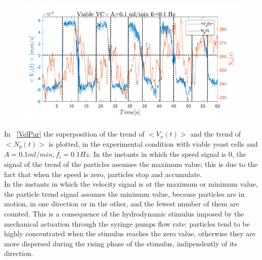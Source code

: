 \documentclass[journal]{IEEEtran}
\theoremstyle{definition}
\theoremstyle{remark}
\begin{document}
\begin{figure}[t]
	\centering
	\includegraphics[width=1\columnwidth]{images/VelPar}
\end{figure}

In ~\fig\ref{VelPar} the superposition of the trend of  $<V_x(t)>$ and the trend of $<N_p(t)>$ is plotted, in the experimental condition with viable yeast cells and {$A=0.1 ml/min, f_i= 0.1 Hz$}. In the instants in which the speed signal is 0, the signal of the trend of the particles assumes the maximum value; this is due to the fact that when the speed is zero, particles stop and accumulate.
\\In the instants in which the velocity signal is at the maximum or minimum value, the particle trend signal assumes the minimum value, because particles are in motion, in one direction or in the other, and the fewest number of them are counted. This is a consequence of the hydrodynamic stimulus imposed by the mechanical actuation through the syringe pumps flow rate: particles tend to be highly concentrated when the stimulus reaches the zero value, otherwise they are more dispersed during the rising phase of the stimulus, indipendently of its direction.
\end{document}
